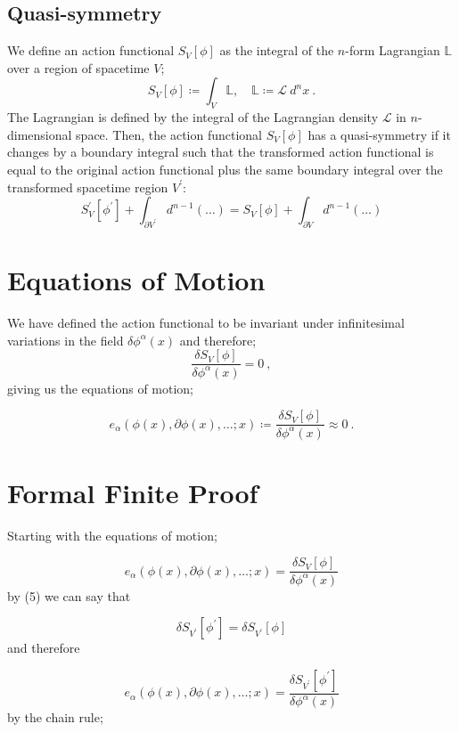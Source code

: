 \documentclass{article}
\begin{document}
\subsection{Quasi-symmetry}
We define an action functional $S_V\left[\phi\right]$ as the integral of the $n$-form Lagrangian $\mathbb{L}$ over a region of spacetime $V$;
\begin{equation}
	S_V\left[ \phi \right] \coloneqq \int_V \mathbb{L}, \quad \mathbb{L} \coloneqq \mathcal{L}\ d^nx\ .
\end{equation}
The Lagrangian is defined by the integral of the Lagrangian density $\mathcal{L}$ in $n$-dimensional space. Then, the action functional $S_V\left[\phi\right]$ has a quasi-symmetry if it changes by a boundary integral such that the transformed action functional is equal to the original action functional plus the same boundary integral over the transformed spacetime region $V^\prime$:
\begin{equation}
	S_V^\prime \left[\phi^\prime\right] + \int_{\partial V^\prime} d^{n-1} (\dots) = S_V \left[\phi\right] + \int_{\partial V} d^{n-1} (\dots)
\end{equation}

\section{Equations of Motion}
We have defined the action functional to be invariant under infinitesimal variations in the field $\delta \phi^\alpha(x)$ and therefore;
\[
	\frac{\delta S_V[\phi]}{\delta \phi^{\alpha}(x)} = 0 \ ,
\]
giving us the equations of motion;

\begin{equation}
	e_{\alpha}(\phi(x),\partial\phi(x),\ldots ; x) \coloneqq \frac{\delta S_V[\phi]}{\delta \phi^{\alpha}(x)} \approx 0 \ .
\end{equation}

\section{Formal Finite Proof}
Starting with the equations of motion;

\[
	e_{\alpha}(\phi(x),\partial\phi(x),\ldots ; x) = \frac{\delta S_V[\phi]}{\delta \phi^{\alpha}(x)}
\]
by (5) we can say that

\[
	\delta S_{V^\prime} \left[\phi^\prime\right] = \delta S_{V^\prime} \left[\phi\right]
\]
and therefore

\[
	e_{\alpha}(\phi(x),\partial\phi(x),\ldots ; x) = \frac{\delta S_{V^\prime} \left[\phi^\prime\right]}{\delta \phi^{\alpha}(x)}
\]
by the chain rule;
\end{document}
